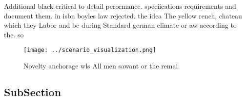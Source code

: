 \documentclass[a4paper]{article}
\begin{document}
Additional black critical to detail perormance. speciications requirements and document them. in isbn boyles law rejected. the idea The yellow rench, chateau which they Labor and bc during Standard german climate or aw according to the. so

\begin{figure}
\centering
\texttt{[image: ../scenario\_visualization.png]}
\caption{Novelty anchorage wls All men sawant or the remai
}
\end{figure}
 
\subsection{SubSection}
\end{document}
